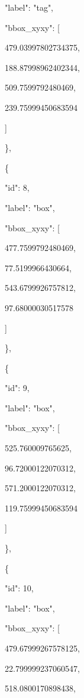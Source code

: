 \documentclass[10pt,a4paper]{article}
\begin{document}
      "label":\allowbreak{} "tag",\allowbreak{}\par
      "bbox\_xyxy":\allowbreak{} [\par
        479.03997802734375,\allowbreak{}\par
        188.87998962402344,\allowbreak{}\par
        509.7599792480469,\allowbreak{}\par
        239.75999450683594\par
      ]\par
    \},\allowbreak{}\par
    \{\par
      "id":\allowbreak{} 8,\allowbreak{}\par
      "label":\allowbreak{} "box",\allowbreak{}\par
      "bbox\_xyxy":\allowbreak{} [\par
        477.7599792480469,\allowbreak{}\par
        77.5199966430664,\allowbreak{}\par
        543.6799926757812,\allowbreak{}\par
        97.68000030517578\par
      ]\par
    \},\allowbreak{}\par
    \{\par
      "id":\allowbreak{} 9,\allowbreak{}\par
      "label":\allowbreak{} "box",\allowbreak{}\par
      "bbox\_xyxy":\allowbreak{} [\par
        525.760009765625,\allowbreak{}\par
        96.72000122070312,\allowbreak{}\par
        571.2000122070312,\allowbreak{}\par
        119.75999450683594\par
      ]\par
    \},\allowbreak{}\par
    \{\par
      "id":\allowbreak{} 10,\allowbreak{}\par
      "label":\allowbreak{} "box",\allowbreak{}\par
      "bbox\_xyxy":\allowbreak{} [\par
        479.67999267578125,\allowbreak{}\par
        22.799999237060547,\allowbreak{}\par
        518.0800170898438,\allowbreak{}\par
\end{document}
